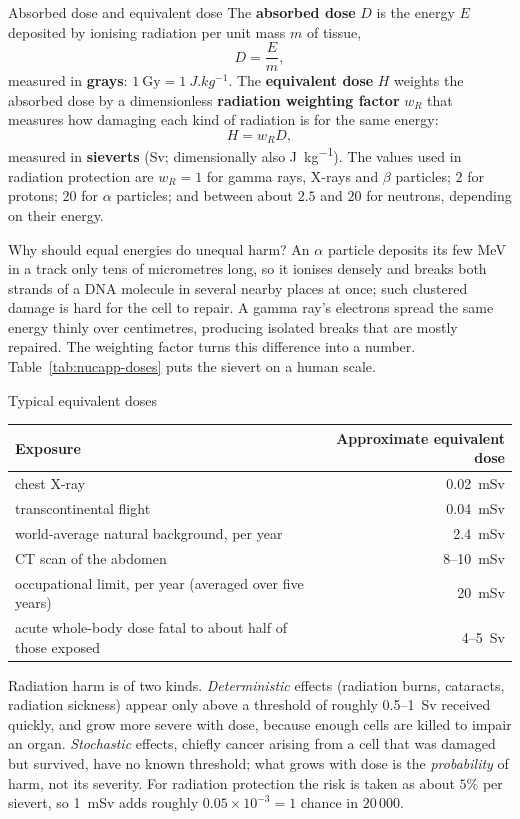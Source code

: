 \begin{defbox}{Absorbed dose and equivalent dose}
The \textbf{absorbed dose} $D$ is the energy $E$ deposited by ionising radiation per unit mass $m$ of
tissue,
\[
D=\frac{E}{m},
\]
measured in \textbf{grays}: $\SI{1}{\gray}=\SI{1}{J.kg^{-1}}$. The \textbf{equivalent dose} $H$ weights
the absorbed dose by a dimensionless \textbf{radiation weighting factor} $w_R$ that measures how damaging
each kind of radiation is for the same energy:
\[
H=w_RD,
\]
measured in \textbf{sieverts} (\si{\sievert}; dimensionally also \si{J.kg^{-1}}). The values used in
radiation protection are $w_R=1$ for gamma rays, X-rays and $\beta$ particles; $2$ for protons; $20$ for
$\alpha$ particles; and between about $2.5$ and $20$ for neutrons, depending on their energy.
\end{defbox}

Why should equal energies do unequal harm? An $\alpha$ particle deposits its few MeV in a track only
tens of micrometres long, so it ionises densely and breaks both strands of a DNA molecule in several nearby
places at once; such clustered damage is hard for the cell to repair. A gamma ray's electrons spread the
same energy thinly over centimetres, producing isolated breaks that are mostly repaired. The weighting
factor turns this difference into a number. Table~\ref{tab:nucapp-doses} puts the sievert on a human scale.

\begin{tablebox}{Typical equivalent doses}
\centering
\begin{tabular}{@{}lr@{}}\toprule
Exposure & Approximate equivalent dose\\\midrule
chest X-ray & \SI{0.02}{\milli\sievert}\\
transcontinental flight & \SI{0.04}{\milli\sievert}\\
world-average natural background, per year & \SI{2.4}{\milli\sievert}\\
CT scan of the abdomen & 8--\SI{10}{\milli\sievert}\\
occupational limit, per year (averaged over five years) & \SI{20}{\milli\sievert}\\
acute whole-body dose fatal to about half of those exposed & 4--\SI{5}{\sievert}\\\bottomrule
\end{tabular}\label{tab:nucapp-doses}
\end{tablebox}

Radiation harm is of two kinds. \emph{Deterministic} effects (radiation burns, cataracts, radiation
sickness) appear only above a threshold of roughly 0.5--\SI{1}{\sievert} received quickly, and grow more
severe with dose, because enough cells are killed to impair an organ. \emph{Stochastic} effects, chiefly
cancer arising from a cell that was damaged but survived, have no known threshold; what grows with dose is
the \emph{probability} of harm, not its severity. For radiation protection the risk is taken as about $5\%$
per sievert, so \SI{1}{\milli\sievert} adds roughly $0.05\times10^{-3}=1$ chance in $20\,000$.

